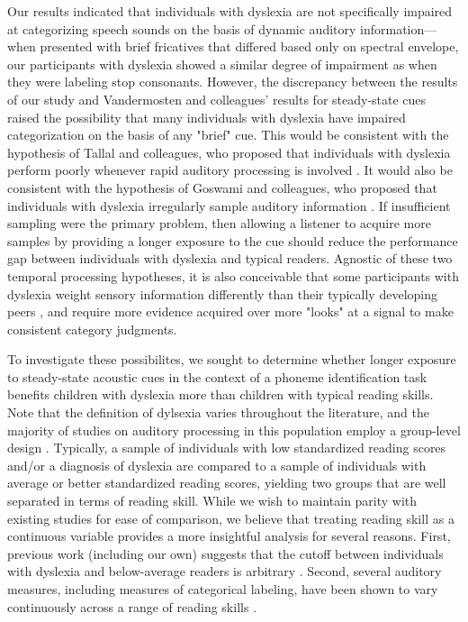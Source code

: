 \documentclass[../uwthesis.tex]{subfiles}
\begin{document}
Our results indicated that individuals with dyslexia are not specifically impaired at categorizing speech sounds on the basis of dynamic auditory information---when presented with brief fricatives that differed based only on spectral envelope, our participants with dyslexia showed a similar degree of impairment as when they were labeling stop consonants. However, the discrepancy between the results of our study and Vandermosten and colleagues' results for steady-state cues raised the possibility that many individuals with dyslexia have impaired categorization on the basis of any "brief" cue. This would be consistent with the hypothesis of Tallal and colleagues, who proposed that individuals with dyslexia perform poorly whenever rapid auditory processing is involved \citep{Merzenich1996,Tallal1996h}. It would also be consistent with the hypothesis of Goswami and colleagues, who proposed that individuals with dyslexia irregularly sample auditory information \citep{Goswami2011}. If insufficient sampling were the primary problem, then allowing a listener to acquire more samples by providing a longer exposure to the cue should reduce the performance gap between individuals with dyslexia and typical readers. Agnostic of these two temporal processing hypotheses, it is also conceivable that some participants with dyslexia weight sensory information differently than their typically developing peers \citep{Nittrouer1999}, and require more evidence acquired over more "looks" at a signal to make consistent category judgments.

To investigate these possibilites, we sought to determine whether longer exposure to steady-state acoustic cues in the context of a phoneme identification task benefits children with dyslexia more than children with typical reading skills. Note that the definition of dylsexia varies throughout the literature, and the majority of studies on auditory processing in this population employ a group-level design \citep{Calcus2016, Law2014, Ramus2003, Talcott2000}. Typically, a sample of individuals with low standardized reading scores and/or a diagnosis of dyslexia are compared to a sample of individuals with average or better standardized reading scores, yielding two groups that are well separated in terms of reading skill. While we wish to maintain parity with existing studies for ease of comparison, we believe that treating reading skill as a continuous variable provides a more insightful analysis for several reasons. First, previous work (including our own) suggests that the cutoff between individuals with dyslexia and below-average readers is arbitrary \citep{OBrien2018, Shaywitz1992}. Second, several auditory measures, including measures of categorical labeling, have been shown to vary continuously across a range of reading skills \citep{Goswami2002,OBrien2018,Vandermosten2010}. 
\end{document}
